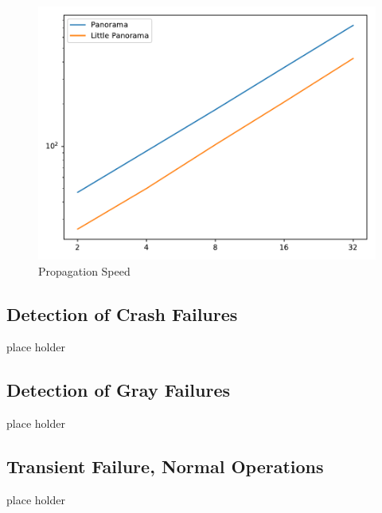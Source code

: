 \begin{figure}[!tb]
\centering
\includegraphics[scale=0.4]{figs/propagation.pdf}
\vspace{-1em}
\caption{Propagation Speed
\label{fig:propagation}
}
\end{figure}

\subsection{Detection of Crash Failures}
place holder

\subsection{Detection of Gray Failures}
place holder

\subsection{Transient Failure, Normal Operations}
place holder
